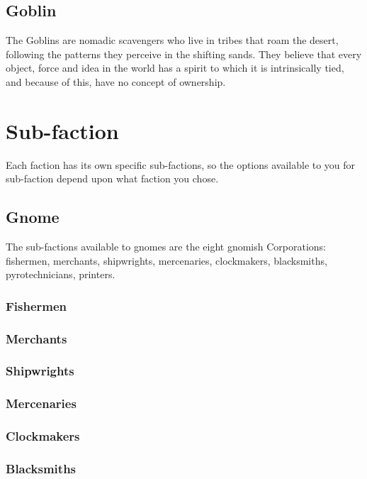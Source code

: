 \documentclass{report}
\begin{document}
\subsection{Goblin}
The Goblins are nomadic scavengers who live in tribes that roam the desert, following the patterns they perceive in the
shifting sands. They believe that every object, force and idea in the world has a spirit to which it is intrinsically tied,
and because of this, have no concept of ownership.

\section{Sub-faction}
Each faction has its own specific sub-factions, so the options available to you for sub-faction depend upon what faction
you chose.

\subsection{Gnome}
The sub-factions available to gnomes are the eight gnomish Corporations: fishermen, merchants, shipwrights, mercenaries, clockmakers, blacksmiths, pyrotechnicians, printers.

\subsubsection{Fishermen}

\subsubsection{Merchants}

\subsubsection{Shipwrights}

\subsubsection{Mercenaries}

\subsubsection{Clockmakers}

\subsubsection{Blacksmiths}
\end{document}
